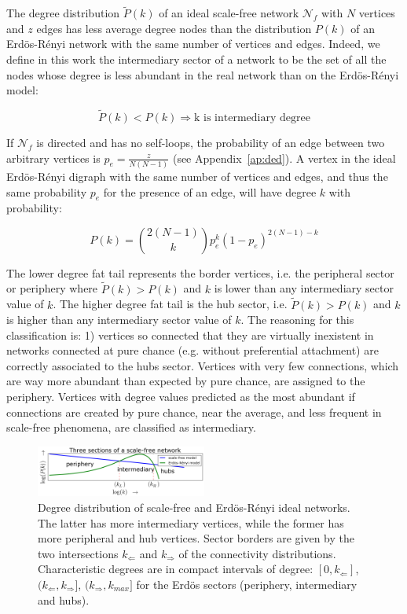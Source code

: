 \documentclass[%
 aip,
 jmp,%
 amsmath,amssymb,
 reprint,%
]{revtex4-1}
\begin{document}
The degree distribution $\widetilde{P}(k)$ of an ideal
scale-free network $\mathcal{N}_f$ with $N$ vertices and $z$ edges has less
average degree nodes than the distribution $P(k)$ of an Erd\"os-R\'enyi
network with the same number of vertices and edges. Indeed, we define in this work the intermediary sector of a network to be the set of all the nodes whose degree is less abundant in the real network than on the Erd\"os-R\'enyi model:

\begin{equation}\label{criterio}
    \widetilde{P}(k)<P(k) \Rightarrow \text{k is intermediary degree}
\end{equation}

If $\mathcal{N}_f$ is directed and has no self-loops, the probability
of an edge between two arbitrary vertices is $p_e=\frac{z}{N(N-1)}$ (see Appendix~\ref{ap:ded}).
A vertex in the ideal Erd\"os-R\'enyi digraph with the same number of vertices and edges, and thus the same probability $p_e$ for the presence of an edge, will have degree $k$ with probability:

\begin{equation}
    P(k)=\binom{2(N-1)}{k}p_e^k(1-p_e)^{2(N-1)-k}
\end{equation}

The lower degree fat tail represents the border vertices, i.e. the peripheral sector or periphery where $\widetilde{P}(k)>P(k)$ and $k$ is lower than any intermediary sector value of $k$. The higher degree fat tail is the hub sector, i.e. $\widetilde{P}(k)>P(k)$ and $k$ is higher than any intermediary sector value of $k$. The reasoning for this classification is: 1) vertices so connected that they are virtually inexistent in networks connected at pure chance (e.g. without preferential attachment) are correctly associated to the hubs sector. Vertices with very few connections, which are way more abundant than expected by pure chance, are assigned to the periphery. Vertices with degree values predicted as the most abundant if connections are created by pure chance, near the average, and less frequent in scale-free phenomena, are classified as intermediary.

\begin{figure}[!h]
    \centering
    \includegraphics[width=0.5\textwidth]{figs/fser_}
    \caption{Degree distribution of scale-free and Erd\"os-R\'enyi ideal networks. The latter has more
        intermediary vertices, while the former has more peripheral and hub vertices. Sector borders are
        given by the two intersections $k_\Leftarrow$ and $k_\Rightarrow$ of the connectivity distributions. Characteristic degrees
    are in compact intervals of degree: $[0,k_\Leftarrow]$, $(k_\Leftarrow,k_\Rightarrow]$, $(k_\Rightarrow,k_{max}]$ for the Erd\"os sectors (periphery, intermediary and hubs).}
    \label{fig:setores}
\end{figure}
\end{document}
